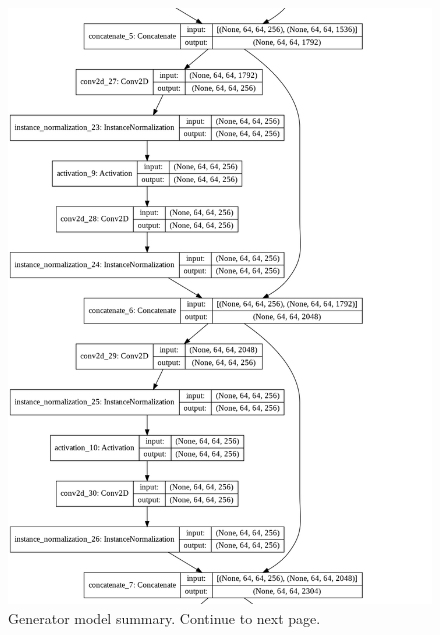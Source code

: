 \begin{figure}[H]
        \vspace*{2cm}
	    \begin{center} 
	    \includegraphics[scale=0.40]{images/Appendix/generator_5.png}
	    \caption{Generator model summary. Continue to next page.}
	    \end{center}
\end{figure}


